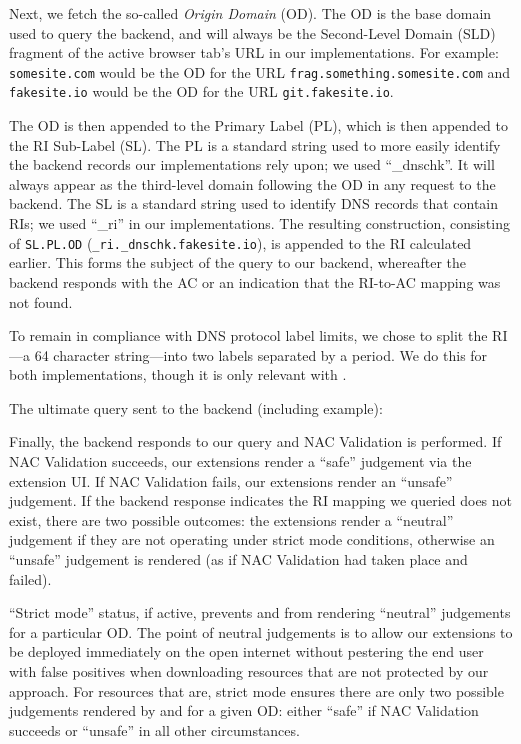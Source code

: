 Next, we fetch the so-called \emph{Origin Domain} (OD). The OD is the base
domain used to query the backend, and will always be the Second-Level Domain
(SLD) fragment of the active browser tab's URL in our implementations. For
example: \texttt{somesite.com} would be the OD for the URL
\texttt{frag.something.somesite.com} and \texttt{fakesite.io} would be the OD
for the URL \texttt{git.fakesite.io}.

The OD is then appended to the Primary Label (PL), which is then appended to the
RI Sub-Label (SL). The PL is a standard string used to more easily identify the
backend records our implementations rely upon; we used ``\_dnschk''. It will
always appear as the third-level domain following the OD in any request to the
backend. The SL is a standard string used to identify DNS records that contain
RIs; we used ``\_ri'' in our implementations. The resulting construction,
consisting of \texttt{SL.PL.OD} (\eg \texttt{\_ri.\_dnschk.fakesite.io}), is
appended to the RI calculated earlier. This forms the subject of the query to
our backend, whereafter the backend responds with the AC or an indication that
the RI-to-AC mapping was not found.

To remain in compliance with DNS protocol label limits, we chose to split the
RI---a 64 character string---into two labels separated by a period. We do this
for both implementations, though it is only relevant with \DNSSYS{}.

The ultimate query sent to the backend (including example):\\

Finally, the backend responds to our query and NAC Validation is performed. If
NAC Validation succeeds, our extensions render a ``safe'' judgement via the
extension UI. If NAC Validation fails, our extensions render an ``unsafe''
judgement. If the backend response indicates the RI mapping we queried does not
exist, there are two possible outcomes: the extensions render a ``neutral''
judgement if they are not operating under strict mode conditions, otherwise an
``unsafe'' judgement is rendered (as if NAC Validation had taken place and
failed).

``Strict mode'' status, if active, prevents \DNSSYS{} and \DHTSYS{} from
rendering ``neutral'' judgements for a particular OD. The point of neutral
judgements is to allow our extensions to be deployed immediately on the open
internet without pestering the end user with false positives when downloading
resources that are not protected by our approach. For resources that are, strict
mode ensures there are only two possible judgements rendered by \DNSSYS{} and
\DHTSYS{} for a given OD: either ``safe'' if NAC Validation succeeds or
``unsafe'' in all other circumstances.

